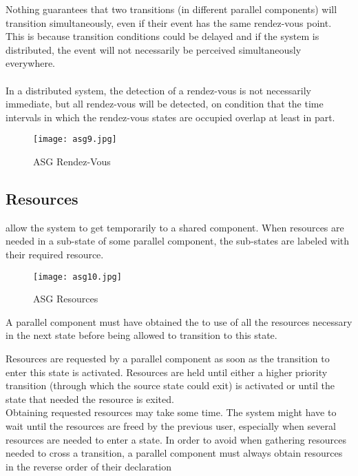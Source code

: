 \documentclass[../main.tex]{subfiles}
\begin{document}
Nothing guarantees that two transitions (in different parallel components) will transition simultaneously, even if their event has the same rendez-vous point.
This is because transition conditions could be delayed and if the system is distributed, the event will not necessarily be perceived simultaneously everywhere.
\\\\
In a distributed system, the detection of a rendez-vous is not necessarily immediate, but all rendez-vous will be detected, on condition that the time intervals in which the rendez-vous states are occupied overlap at least in part.
\begin{figure}[H]
    \centering
    \texttt{[image: asg9.jpg]}
    \caption{ASG Rendez-Vous}
    \label{asg9}
\end{figure}

\subsection{Resources}
 allow the system to get temporarily  to a shared component. When resources are needed in a sub-state of some parallel component, the sub-states are labeled with their required resource.


\begin{figure}[H]
    \centering
    \texttt{[image: asg10.jpg]}
    \caption{ASG Resources}
    \label{asg10}
\end{figure}
A parallel component must have obtained the  to use of all the resources necessary in the next state before being allowed to transition to this state.

Resources are requested by a parallel component as soon as the transition to enter this state is activated.
Resources are held until either a higher priority transition (through which the source state could exit) is activated or until the state that needed the resource is exited.
\\
Obtaining requested resources may take some time.
The system might have to wait until the resources are freed by the previous user, especially when several resources are needed to enter a state.
In order to avoid  when gathering resources needed to cross a transition, a parallel component must always obtain resources in the reverse order of their declaration
\end{document}
